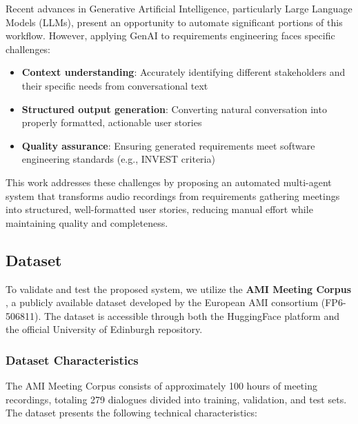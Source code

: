 \documentclass[12pt]{article}
\begin{document}
Recent advances in Generative Artificial Intelligence, particularly Large Language Models (LLMs), present an opportunity to automate significant portions of this workflow. However, applying GenAI to requirements engineering faces specific challenges:

\begin{itemize}
    \item \textbf{Context understanding}: Accurately identifying different stakeholders and their specific needs from conversational text
    \item \textbf{Structured output generation}: Converting natural conversation into properly formatted, actionable user stories
    \item \textbf{Quality assurance}: Ensuring generated requirements meet software engineering standards (e.g., INVEST criteria)
\end{itemize}

This work addresses these challenges by proposing an automated multi-agent system that transforms audio recordings from requirements gathering meetings into structured, well-formatted user stories, reducing manual effort while maintaining quality and completeness.


\subsection{Dataset}
\label{sec:dataset}

To validate and test the proposed system, we utilize the \textbf{AMI Meeting Corpus} \cite{ami_dataset}, a publicly available dataset developed by the European AMI consortium (FP6-506811). The dataset is accessible through both the HuggingFace platform and the official University of Edinburgh repository.

\subsubsection{Dataset Characteristics}

The AMI Meeting Corpus consists of approximately 100 hours of meeting recordings, totaling 279 dialogues divided into training, validation, and test sets. The dataset presents the following technical characteristics:
\end{document}
